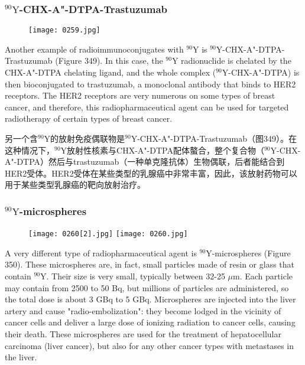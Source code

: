 \documentclass[dvipsnames, svgnames,a4paper,11pt]{article}
\begin{document}
\subsubsection{\(\mathrm{^{90}Y}\)-CHX-A"-DTPA-Trastuzumab}

\begin{figure}[h]
    \centering
    \texttt{[image: 0259.jpg]}
     \label{fig349}
\end{figure}

Another example of radioimmunoconjugates with \(\mathrm{^{90}Y}\) is \(\mathrm{^{90}Y}\)-CHX-A"-DTPA-Trastuzumab (Figure 349). In this case, the \(\mathrm{^{90}Y}\) radionuclide is chelated by the CHX-A"-DTPA chelating ligand, and the whole complex (\(\mathrm{^{90}Y}\)-CHX-A"-DTPA) is then bioconjugated to trastuzumab, a monoclonal antibody that binds to HER2 receptors. The HER2 receptors are very numerous on some types of breast cancer, and therefore, this radiopharmaceutical agent can be used for targeted radiotherapy of certain types of breast cancer.

另一个含\(\mathrm{^{90}Y}\)的放射免疫偶联物是\(\mathrm{^{90}Y}\)-CHX-A"-DTPA-Trastuzumab（图349）。在这种情况下，\(\mathrm{^{90}Y}\)放射性核素与CHX-A"-DTPA配体螯合，整个复合物（\(\mathrm{^{90}Y}\)-CHX-A"-DTPA）然后与trastuzumab（一种单克隆抗体）生物偶联，后者能结合到HER2受体。HER2受体在某些类型的乳腺癌中非常丰富，因此，该放射药物可以用于某些类型乳腺癌的靶向放射治疗。

\subsubsection{\(\mathrm{^{90}Y}\)-microspheres}  

\begin{figure}[h]
    \centering
    \texttt{[image: 0260[2].jpg]}
    \hspace{0.2in}
    \texttt{[image: 0260.jpg]}
     \label{fig350}
\end{figure}

A very different type of radiopharmaceutical agent is \(\mathrm{^{90}Y}\)-microspheres (Figure 350). These microspheres are, in fact, small particles made of resin or glass that contain \(\mathrm{^{90}Y}\). Their size is very small, typically between 32-25 $\mu$m. Each particle may contain from 2500 to 50 Bq, but millions of particles are administered, so the total dose is about 3 GBq to 5 GBq. Microspheres are injected into the liver artery and cause "radio-embolization": they become lodged in the vicinity of cancer cells and deliver a large dose of ionizing radiation to cancer cells, causing their death. These microspheres are used for the treatment of hepatocellular carcinoma (liver cancer), but also for any other cancer types with metastases in the liver.
\end{document}
